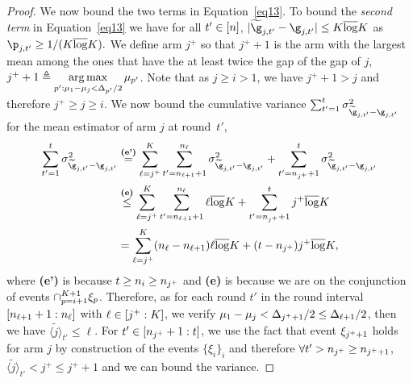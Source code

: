 \begin{proof}
We  now bound the two terms in Equation~\ref{eq13}.
To bound the \emph{second term} in Equation~\ref{eq13} we have
for all $t'\in[n]$,
$|\estGainVector_{j,t'}-\gainVector_{j,t'}|\leq 
\nArms\bar\log \nArms$ as $\learnerDist_{j,t'}
\geq 1/(\nArms\bar\log\nArms).$
We define  arm $j^+$ so that 
$j^+ +1$  is the arm with the largest mean among the ones that have the at least twice the gap of the gap of $j$,  %
$j^+  +1 \triangleq \mathop{\arg\max}\limits_{p':\mu_1-\mu_j<\Delta_{p'}/2}
\mu_{p'}$. Note that as $j\geq i>1$, we have $j^++1> j
$ and therefore $j^+\geq j\geq i$.
We now bound the cumulative variance $\sum_{t'=1}^t \var_{\estGainVector_{j,t'}-\gainVector_{j,t'}}$ for the mean estimator of arm $j$ at round~$t'$, 
%
\begin{align*}
%
\sum_{t'=1}^t \var_{\estGainVector_{j,t'}-\gainVector_{j,t'}}
&\stackrel{\textbf{(e')}}{=}
\sum_{\ell=j^+}^{\nArms}
\sum_{t'=\phaseTime_{\ell+1}+1}^{\phaseTime_{\ell}}
\var_{\estGainVector_{j,t'}-\gainVector_{j,t'}}
+
\sum_{t'=\phaseTime_{j^+ }+1}^{t}
\var_{\estGainVector_{j,t'}-\gainVector_{j,t'}}\\
&\stackrel{\textbf{(e)}}{\leq}
\sum_{\ell=j^+}^{\nArms}
\sum_{t'=\phaseTime_{\ell+1}+1}^{\phaseTime_{\ell}}
\ell\bar\log\nArms
+
\sum_{t'=\phaseTime_{j^+}+1}^{t}
j^+\bar\log\nArms\\
&=
\sum_{\ell=j^+}^{\nArms}
(\phaseTime_{\ell}-\phaseTime_{\ell+1})
\ell\bar\log\nArms
+
(t-\phaseTime_{j^+})
j^+\bar\log\nArms,
%
 \end{align*}
 where \textbf{(e')} is because   $t\geq n_i\geq 
  n_{j^+ }$ and \textbf{(e)} is because we are on 
  the conjunction of events  $\cap_{p=i+1}^{K+1}
   \xi_{p}$. Therefore, as for each round $t'$ in the
    round interval $[n_{\ell+1}+1:n_{\ell}]$  
    with $\ell\in [j^+:K]$, we verify $\mu_1-\mu_j
    <\Delta_{j^+ +1}/2\leq\Delta_{\ell+1}/2$, then we have $\tilde{\langle j \rangle}_{t'}
    \leq \ell$. For $t'\in [n_{j^+}+1:t ]$, we use the 
    fact that  event $ \xi_{j^++1}$   holds for arm $j$ by 
    construction  of the events $\{\xi_i\}_i$ and therefore $\forall t'> n_{j^+}
    \geq n_{j^++1}$, $\tilde{\langle j \rangle}_{t'}<j^+ \leq j^+ +1$ and we 
    can bound the variance.
%


\end{proof}
